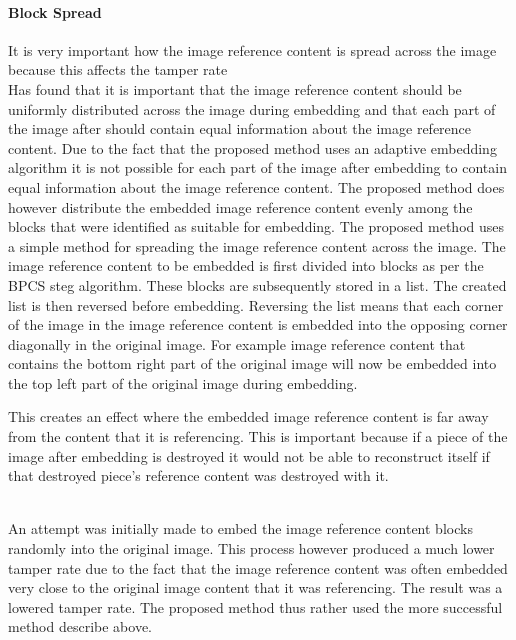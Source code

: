 \documentclass[12pt]{article}
\begin{document}
\paragraph{Block Spread}
It is very important how the image reference content is spread across the image because this affects the tamper rate
\hspace{0pt} \\
\cite{korus2013efficient} Has found that it is important that the image reference content should be uniformly distributed across the image during embedding and that each part of the image after should contain equal information about the image reference content.
Due to the fact that the proposed method uses an adaptive embedding algorithm it is not possible for each part of the image after embedding to contain equal information about the image reference content.
The proposed method does however distribute the embedded image reference content evenly among the blocks that were identified as suitable for embedding.
The proposed method uses a simple method for spreading the image reference content across the image.
The image reference content to be embedded is first divided into blocks as per the BPCS steg algorithm.
These blocks are subsequently stored in a list. 
The created list is then reversed before embedding.
Reversing the list means that each corner of the image in the image reference content is embedded into the opposing corner diagonally in the original image. For example image reference content that contains the bottom right part of the original image will now be embedded into the top left part of the original image during embedding.

This creates an effect where the embedded image reference content is far away from the content that it is referencing.
This is important because if a piece of the image after embedding is destroyed it would not be able to reconstruct itself if that destroyed piece's reference content was destroyed with it.

\hspace{0pt} \\
An attempt was initially made to embed the image reference content blocks randomly into the original image.
This process however produced a much lower tamper rate due to the fact that the image reference content was often embedded very close to the original image content that it was referencing.
The result was a lowered tamper rate.
The proposed method thus rather used the more successful method describe above.
\end{document}
